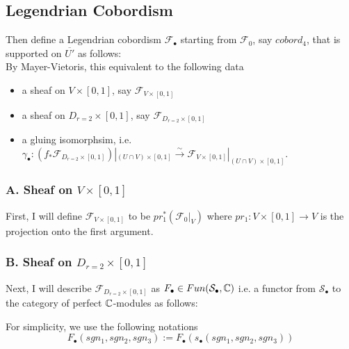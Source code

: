 \subsection*{Legendrian Cobordism}
Then define a Legendrian cobordism $\mathscr{F}_\bullet$ starting from $\mathscr{F}_0$, say $cobord_4$, that is supported on $\overline{U'}$ as follows:\\

By Mayer-Vietoris, this equivalent to the following data
\begin{itemize}
\item a sheaf on $V\times [0,1]$, say $\mathscr{F}_{V\times [0,1]}$

\item a sheaf on $D_{r=2}\times [0,1]$, say $\mathscr{F}_{D_{r=2}\times [0,1]}$

\item a gluing isomorphsim, i.e. $\gamma_\bullet : (f_*\mathscr{F}_{D_{r=2}\times [0,1]})|_{(U\cap V)\times [0,1]} \xrightarrow{\sim} \mathscr{F}_{V\times [0,1]}|_{(U\cap V)\times [0,1]}$.
\end{itemize}
\subsubsection{A. Sheaf on $V\times [0,1]$}
First, I will define $\mathscr{F}_{V\times [0,1]}$ to be $pr_1^*(\mathscr{F}_0|_V)$ where $pr_1 : V \times [0,1] \rightarrow V$ is the projection onto the first argument.
\subsubsection{B. Sheaf on $D_{r=2}\times [0,1]$}
Next, I will describe $\mathscr{F}_{D_{r=2}\times [0,1]}$ as $F_\bullet \in Fun(\mathcal{S}_\bullet,\mathbb{C})$ i.e. a functor from $\mathcal{S}_\bullet$ to the category of perfect $\mathbb{C}$-modules as follows: 

For simplicity, we use the following notations
\[
F_\bullet(sgn_1,sgn_2,sgn_3):= F_\bullet(s_\bullet(sgn_1,sgn_2,sgn_3))
\]

